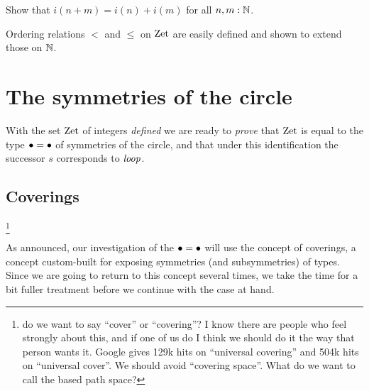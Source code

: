 \begin{xca}\label{xca:addition-on-Z-and-N}
Show that $i(n+m)=i(n)+i(m)$ for all $n,m:\mathbb{N}$.
\end{xca}

Ordering relations $<$ and $\leq$ on $\mathrm{Zet}$ are easily defined
and shown to extend those on $\mathbb{N}$.

\section{The symmetries of the circle}
\label{sec:pi1S1isZ}

With the set $\mathrm{Zet}$ of integers \emph{defined} we are ready to \emph{prove} that $\mathrm{Zet}$ is equal to the type $\bullet=\bullet$ of symmetries of the circle, and that under this identification the successor $s$ corresponds to $\mathit{loop}$.


\subsection{Coverings}\footnote{do we want to say ``cover'' or ``covering''?  I know there are people who feel strongly about this, and if one of us do I think we should do it the way that person wants it.  Google gives 129k hits on ``universal covering'' and 504k hits on ``universal cover''.  We should avoid ``covering space''.  What do we want to call the based path space?}
\label{sec:covering}



As announced, our investigation of the $\bullet=\bullet$ will use the concept of coverings, a concept custom-built for exposing symmetries (and subsymmetries) of types.  Since we are going to return to this concept several times, we take the time for a bit fuller treatment before we continue with the case at hand.


